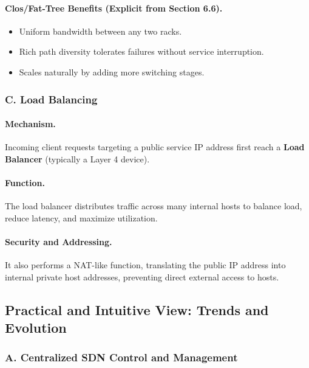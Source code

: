 \documentclass[12pt]{article}
\begin{document}
\paragraph*{Clos/Fat-Tree Benefits (Explicit from Section 6.6).}
\begin{itemize}
    \item Uniform bandwidth between any two racks.
    \item Rich path diversity tolerates failures without service interruption.
    \item Scales naturally by adding more switching stages.
\end{itemize}


\subsubsection{C. Load Balancing}

\paragraph*{Mechanism.}
Incoming client requests targeting a public service IP address first reach a \textbf{Load Balancer} (typically a Layer 4 device).

\paragraph*{Function.}
\cite{13778} The load balancer distributes traffic across many internal hosts to balance load, reduce latency, and maximize utilization.

\paragraph*{Security and Addressing.}
\cite{13778} It also performs a NAT-like function, translating the public IP address into internal private host addresses, preventing direct external access to hosts.


\subsection{Practical and Intuitive View: Trends and Evolution}

\subsubsection{A. Centralized SDN Control and Management}
\end{document}
